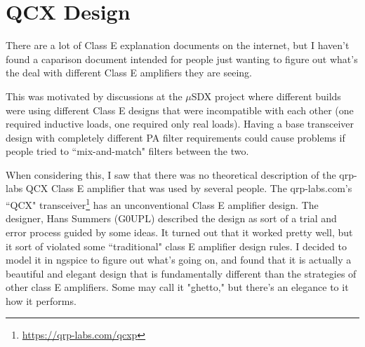 \documentclass[10pt,letterpaper]{article}
\begin{document}
%
%
%
%
%


\section{QCX Design}\label{qcxdesign}
There are a lot of Class E explanation documents on the internet, but I haven't found a caparison document intended for people just wanting to figure out what's the deal with different Class E amplifiers they are seeing.

This was motivated by discussions at the $\mu$SDX project where different builds were using different Class E designs that were incompatible with each other (one required inductive loads, one required only real loads). Having a base transceiver design with completely different PA filter requirements could cause problems if people tried to ``mix-and-match" filters between the two.

When considering this, I saw that there was no theoretical description of the qrp-labs QCX Class E amplifier that was used by several people. The qrp-labs.com's ``QCX" transceiver\footnote{\url{https://qrp-labs.com/qcxp}} has an unconventional Class E amplifier design. The designer, Hans Summers (G0UPL) described the design as sort of a trial and error process guided by some ideas. It turned out that it worked pretty well, but it sort of violated some ``traditional" class E amplifier design rules. I decided to model it in ngspice to figure out what's going on, and found that it is actually a beautiful and elegant design that is fundamentally different than the strategies of other class E amplifiers. Some may call it "ghetto," but there's an elegance to it how it performs.
\end{document}
